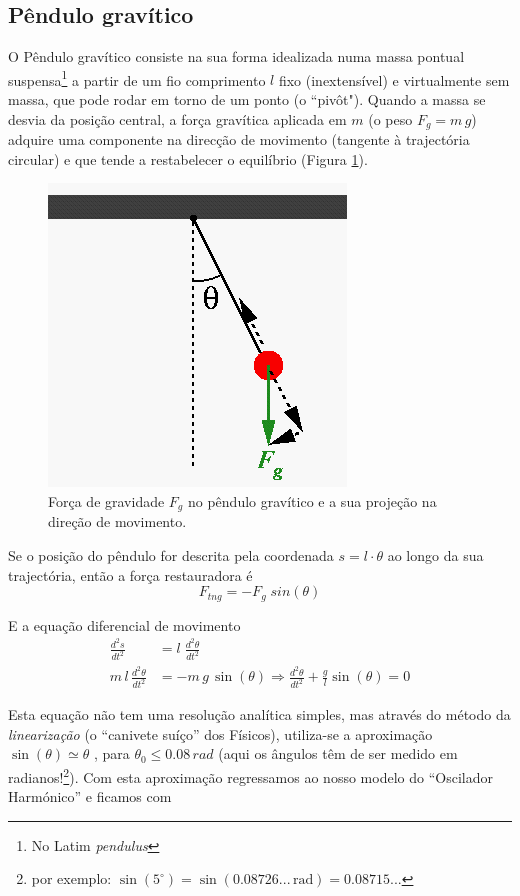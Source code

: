\documentclass[a4paper,twoside,12pt]{article}      %
\begin{document}
\subsection{\sf Pêndulo gravítico}
O Pêndulo gravítico  consiste na sua forma idealizada numa massa pontual suspensa\footnote{No Latim \emph{pendulus}} a partir de um fio comprimento $l$ fixo (inextensível) e virtualmente sem massa, que pode rodar em torno de um ponto (o ``pivôt"). Quando a massa se desvia da posição central, a força gravítica aplicada em $m$ (o peso $F_g = m \, g $) adquire uma componente na direcção de movimento (tangente à trajectória circular) e que tende a restabelecer o equilíbrio (Figura \ref{fig:3}). 

\begin{figure}
	[!htbp] \centering 
	
	\includegraphics[width=0.5	\textwidth]{forcespend} \caption{Força de gravidade $F_g$ no pêndulo gravítico e a sua projeção na direção de movimento. \label{fig:3} } 
\end{figure}

Se o posição do pêndulo for descrita pela coordenada $s= l\cdot \theta$ ao longo da sua trajectória, 
então a força restauradora é 
\begin{equation}
	\label{eq:4} 
F_{tng} = - F_{g} \; sin(\theta) 
\end{equation}

E a equação diferencial de movimento 
\begin{align}
	\label{eq:5} 
	\frac{d^2 s}{dt^2} &=  l\;  \frac{d^2 \theta}{dt^2} \nonumber \\
	m \, l \, \frac{d^2 \theta}{dt^2} &= - m \,  g \, \sin(\theta)  \Rightarrow \frac{d^2 \theta}{dt^2} + \frac{g}{l} \sin(\theta) = 0
\end{align}

Esta equação não tem uma resolução analítica simples, mas através do método  da \emph{linearização} (o ``canivete suíço'' dos Físicos), utiliza-se a aproximação $ \sin(\theta) \simeq \theta$ , para  $\theta_0 \le 0.08\,rad$ (aqui  os ângulos têm de ser medido em radianos!\footnote{ por exemplo: $\sin(5 ^{\circ}) = \sin(0.08726... \, \text{rad}) = 0.08715... $}).
Com esta aproximação regressamos ao nosso modelo do ``Oscilador Harmónico'' e ficamos com 
\end{document}
